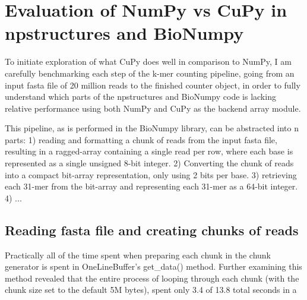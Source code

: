 \section{Evaluation of NumPy vs CuPy in npstructures and BioNumpy}
To initiate exploration of what CuPy does well in comparison to NumPy, I am carefully benchmarking each step of the k-mer counting pipeline, going from an input fasta file of 20 million reads to the finished counter object, in order to fully understand which parts of the npstructures and BioNumpy code is lacking relative performance using both NumPy and CuPy as the backend array module.

This pipeline, as is performed in the BioNumpy library, can be abstracted into n parts: 
1) reading and formatting a chunk of reads from the input fasta file, resulting in a ragged-array containing a single read per row, where each base is represented as a single unsigned 8-bit integer. 
2) Converting the chunk of reads into a compact bit-array representation, only using 2 bits per base. 
3) retrieving each 31-mer from the bit-array and representing each 31-mer as a 64-bit integer. 
4) ...

\subsection{Reading fasta file and creating chunks of reads}
Practically all of the time spent when preparing each chunk in the chunk generator is spent in OneLineBuffer\textsc{'}s get\_data() method.
Further examining this method revealed that the entire process of looping through each chunk (with the chunk size set to the default 5M bytes), spent only 3.4 of 13.8 total seconds in a 
